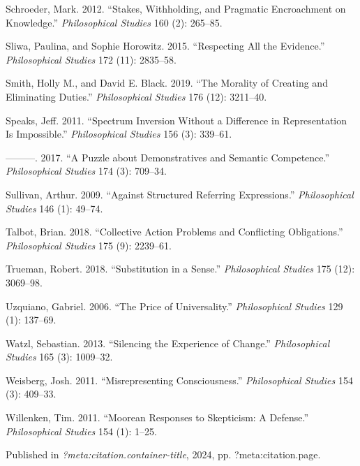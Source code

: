 \documentclass[
  10pt,
  letterpaper,
  DIV=11,
  numbers=noendperiod,
  twoside]{scrartcl}
\newlength{\cslhangindent}
\newenvironment{CSLReferences}[2] %
 {\begin{list}{}{%
  \setlength{\itemindent}{0pt}
  \setlength{\leftmargin}{0pt}
  \setlength{\parsep}{0pt}
  \ifodd #1
   \setlength{\leftmargin}{\cslhangindent}
   \setlength{\itemindent}{-1\cslhangindent}
  \fi
  \setlength{\itemsep}{#2\baselineskip}}}
 {\end{list}}
\begin{document}
\begin{CSLReferences}{1}{0}
Schroeder, Mark. 2012. {``Stakes, Withholding, and Pragmatic
Encroachment on Knowledge.''} \emph{Philosophical Studies} 160 (2):
265--85.

Sliwa, Paulina, and Sophie Horowitz. 2015. {``Respecting All the
Evidence.''} \emph{Philosophical Studies} 172 (11): 2835--58.

Smith, Holly M., and David E. Black. 2019. {``The Morality of Creating
and Eliminating Duties.''} \emph{Philosophical Studies} 176 (12):
3211--40.

Speaks, Jeff. 2011. {``Spectrum Inversion Without a Difference in
Representation Is Impossible.''} \emph{Philosophical Studies} 156 (3):
339--61.

---------. 2017. {``A Puzzle about Demonstratives and Semantic
Competence.''} \emph{Philosophical Studies} 174 (3): 709--34.

Sullivan, Arthur. 2009. {``Against Structured Referring Expressions.''}
\emph{Philosophical Studies} 146 (1): 49--74.

Talbot, Brian. 2018. {``Collective Action Problems and Conflicting
Obligations.''} \emph{Philosophical Studies} 175 (9): 2239--61.

Trueman, Robert. 2018. {``Substitution in a Sense.''}
\emph{Philosophical Studies} 175 (12): 3069--98.

Uzquiano, Gabriel. 2006. {``The Price of Universality.''}
\emph{Philosophical Studies} 129 (1): 137--69.

Watzl, Sebastian. 2013. {``Silencing the Experience of Change.''}
\emph{Philosophical Studies} 165 (3): 1009--32.

Weisberg, Josh. 2011. {``Misrepresenting Consciousness.''}
\emph{Philosophical Studies} 154 (3): 409--33.

Willenken, Tim. 2011. {``Moorean Responses to Skepticism: A Defense.''}
\emph{Philosophical Studies} 154 (1): 1--25.

\end{CSLReferences}



\noindent Published in\emph{
?meta:citation.container-title}, 2024, pp. ?meta:citation.page.
\end{document}
